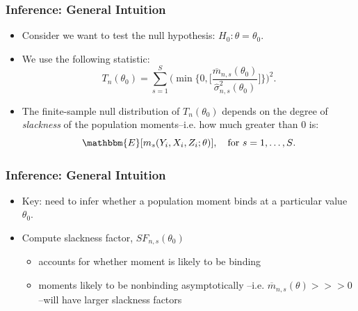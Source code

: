 \documentclass[notes=show]{beamer}
\begin{document}

\begin{frame}
\frametitle{Inference: General Intuition}

\begin{itemize}
\item Consider we want to test the null hypothesis: $H_{0}: \theta=\theta_{0}
$. 

\item We use the following statistic:  
\begin{equation*}
T_{n}(\theta_{0})=\sum_{s=1}^{S}\Big(\min\{0,\Big[\frac{\overline{m}%
_{n,s}(\theta_{0})}{\hat{\sigma}^{2}_{n,s}(\theta_{0})}\Big]\}\Big)^{2}.
\end{equation*}

\item The finite-sample null distribution of $T_{n}(\theta_{0})$ depends on
the degree of \textit{slackness} of the population moments--i.e. how much
greater than 0 is:  
\begin{equation*}
\mathbbm{E}[m_{s}(Y_{i},X_{i},Z_{i};\theta)],\quad\text{for $s=1,\dots,S$}.
\end{equation*}

\end{itemize}
\end{frame}


\begin{frame}
\frametitle{Inference: General Intuition}

\begin{itemize}
\item Key: need to infer whether a population moment binds at a particular
value $\theta_{0}$. 

\item Compute slackness factor, $SF_{n,s}(\theta_{0})$ 

\begin{itemize}
\item accounts for whether moment is likely to be binding 

\item moments likely to be nonbinding asymptotically --i.e. $\overline{m}%
_{n,s}(\theta)>>>0$--will have larger slackness factors 
\end{itemize}
\end{itemize}
\end{frame}

\end{document}
